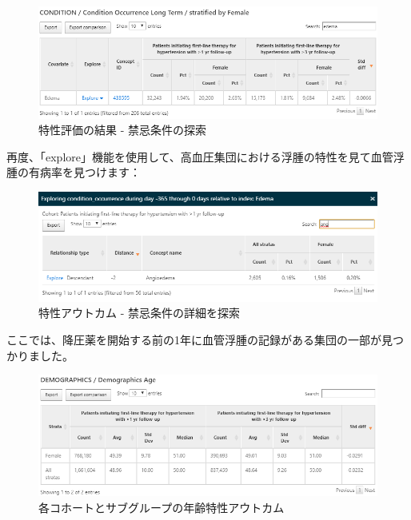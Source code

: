 \documentclass[
  11pt]{book}
\theoremstyle{definition}
\theoremstyle{definition}
\theoremstyle{definition}
\theoremstyle{definition}
\theoremstyle{remark}
\begin{document}
\begin{figure}

{\centering \includegraphics[width=1\linewidth]{images/Characterization/atlasCharacterizationResultsContra} 

}

\caption{特性評価の結果 - 禁忌条件の探索}\label{fig:atlasCharacterizationResultsContra}
\end{figure}

再度、「explore」機能を使用して、高血圧集団における浮腫の特性を見て血管浮腫の有病率を見つけます：

\begin{figure}

{\centering \includegraphics[width=1\linewidth]{images/Characterization/atlasCharacterizationResultsContraExplore} 

}

\caption{特性アウトカム - 禁忌条件の詳細を探索}\label{fig:atlasCharacterizationResultsContraExplore}
\end{figure}

ここでは、降圧薬を開始する前の1年に血管浮腫の記録がある集団の一部が見つかりました。

\begin{figure}

{\centering \includegraphics[width=1\linewidth]{images/Characterization/atlasCharacterizationResultsContinuous} 

}

\caption{各コホートとサブグループの年齢特性アウトカム}\label{fig:atlasCharacterizationResultsContinuous}
\end{figure}
\end{document}
